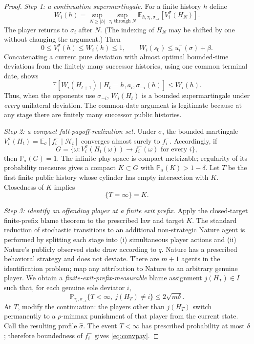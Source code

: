 \documentclass[11pt,a4paper]{article}
\numberwithin{equation}{section}
\theoremstyle{definition}
\theoremstyle{remark}
\newcommand{\E}{\mathbb E}
\newcommand{\Pp}{\mathbb P}
\newcommand{\calH}{\mathcal H}
\newcommand{\sig}{\sigma}
\begin{document}
\begin{proof}
\emph{Step 1: a continuation supermartingale.}
For a finite history $h$ define
\begin{equation}\label{eq:W}
 W_i(h)=\sup_{N\ge |h|}\sup_{\tau_i\text{ through }N}
 \E_{h,\tau_i,\sig_{-i}}\!
 \left[V_i^\sig(H_N)\right].
\end{equation}
The player returns to $\sig_i$ after $N$. (The indexing of $H_N$ may
be shifted by one without changing the argument.) Then
\begin{equation}\label{eq:Wbound}
 0\le V_i^\sig(h)\le W_i(h)\le1,
 \qquad W_i(s_0)\le u_i^-(\sig)+\beta.
\end{equation}
Concatenating a current pure deviation with almost optimal bounded-time
deviations from the finitely many successor histories, using one common
terminal date, shows
\begin{equation}\label{eq:Wsuper}
 \E\left[W_i(H_{t+1})\mid H_t=h,a_i,\sig_{-i}(h)\right]
 \le W_i(h).
\end{equation}
Thus, when the opponents use $\sig_{-i}$, $W_i(H_t)$ is a bounded
supermartingale under \emph{every} unilateral deviation. The common-date
argument is legitimate because at any stage there are finitely many
successor public histories.

\emph{Step 2: a compact full-payoff-realization set.}
Under $\sig$, the bounded martingale
$V_i^\sig(H_t)=\E_\sig[f_i^-\mid\calH_t]$ converges almost surely to
$f_i^-$. Accordingly, if
\[
 G=\{\omega: V_i^\sig(H_t(\omega))\to f_i^-(\omega)
 \text{ for every }i\},
\]
then $\Pp_\sig(G)=1$. The infinite-play space is compact metrizable;
regularity of its probability measures gives a compact $K\subset G$
with $\Pp_\sig(K)>1-\delta$.
Let $T$ be the first finite public history whose cylinder has empty
intersection with $K$. Closedness of $K$ implies
\begin{equation}\label{eq:exit}
 \{T=\infty\}=K.
\end{equation}

\emph{Step 3: identify an offending player at a finite exit prefix.}
Apply the closed-target finite-prefix blame theorem
\cite[Section~4]{alon2024} to the prescribed law and target $K$.
The standard reduction of stochastic transitions to an additional
non-strategic Nature agent is performed by splitting each stage into
(i) simultaneous player actions and (ii) Nature's publicly observed
state draw according to $q$. Nature has a prescribed behavioral strategy
and does not deviate. There are $m+1$ agents in the identification
problem; map any attribution to Nature to an arbitrary genuine player.
We obtain a \emph{finite-exit-prefix-measurable} blame assignment
$j(H_T)\in I$ such that, for each genuine sole deviator $i$,
\begin{equation}\label{eq:blame}
 \Pp_{\tau_i,\sig_{-i}}\{T<\infty,\ j(H_T)\ne i\}
 \le 2\sqrt{m\delta}.
\end{equation}
At $T$, modify the continuation: the players other than $j(H_T)$
switch permanently to a $\rho$-minmax punishment of that player from
the current state. Call the resulting profile $\widehat\sig$.
The event $T<\infty$ has prescribed probability at most $\delta$;
therefore boundedness of $f_i^-$ gives \eqref{eq:convpay}.


\end{proof}
\end{document}
